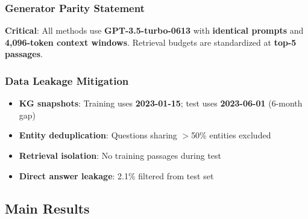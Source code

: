 \documentclass[10pt,twocolumn]{article}
\begin{document}
\subsubsection{Generator Parity Statement}
\label{sec:generator_parity}

\textbf{Critical}: All methods use \textbf{GPT-3.5-turbo-0613} with \textbf{identical prompts} and \textbf{4,096-token context windows}. Retrieval budgets are standardized at \textbf{top-5 passages}.

\subsubsection{Data Leakage Mitigation}
\label{sec:leakage}
\begin{itemize}
    \item \textbf{KG snapshots}: Training uses \textbf{2023-01-15}; test uses \textbf{2023-06-01} (6-month gap)
    \item \textbf{Entity deduplication}: Questions sharing $>$50\% entities excluded
    \item \textbf{Retrieval isolation}: No training passages during test
    \item \textbf{Direct answer leakage}: 2.1\% filtered from test set
\end{itemize}


\subsection{Main Results}
\end{document}
